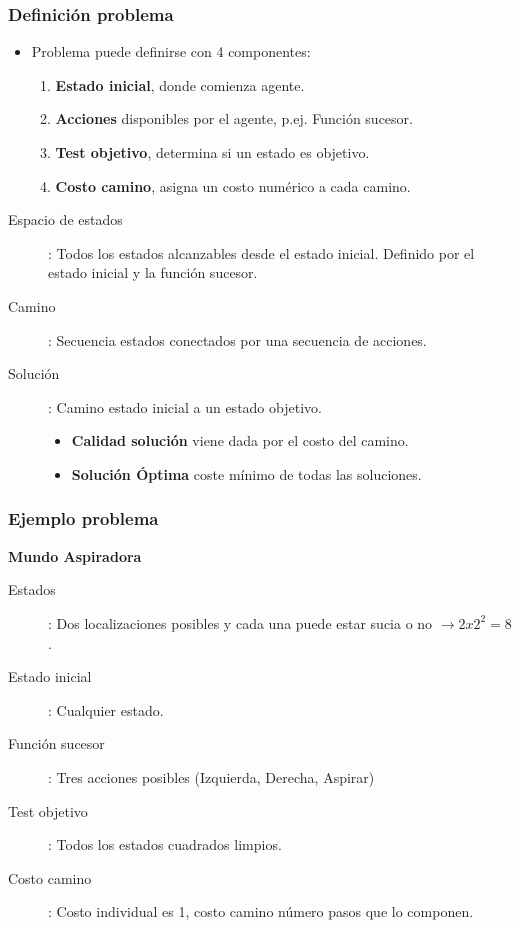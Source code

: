 \documentclass[xcolor=table]{beamer}
\begin{document}

\begin{frame} \frametitle{Definición problema} \footnotesize

\begin{itemize}
\item Problema puede definirse con 4 componentes:

\begin{enumerate}
\item \textbf{Estado inicial}, donde comienza agente.
\item \textbf{Acciones} disponibles por el agente, p.ej. Función sucesor.
\item \textbf{Test objetivo}, determina si un estado es objetivo. 
\item \textbf{Costo camino},  asigna un costo numérico a cada camino.
\end{enumerate}


\end{itemize}

\begin{description}
\item[Espacio de estados]: Todos los estados alcanzables desde el estado inicial. Definido por el estado inicial y la función sucesor.
\item[Camino] : Secuencia estados conectados por una secuencia de acciones.
\item[Solución] : Camino estado inicial a un estado objetivo.
\begin{itemize}
\item \textbf{Calidad solución} viene dada por el costo del camino.
\item \textbf{Solución Óptima} coste mínimo de todas las soluciones.
\end{itemize}

\end{description}


\end{frame} 


\begin{frame} \frametitle{Ejemplo problema} \footnotesize

\begin{center}
\textbf{Mundo Aspiradora}
\end{center}

\begin{description}
\item[Estados]: Dos localizaciones posibles y cada una puede estar sucia o no  $\rightarrow 2x 2^{2}=8$.
\item[Estado inicial]: Cualquier estado.
\item[Función sucesor]: Tres acciones posibles (Izquierda, Derecha, Aspirar)
\item[Test objetivo]: Todos los estados cuadrados limpios. 
\item[Costo camino]: Costo individual es 1, costo camino número pasos que lo componen.
\end{description}




\end{frame} 
\end{document}
